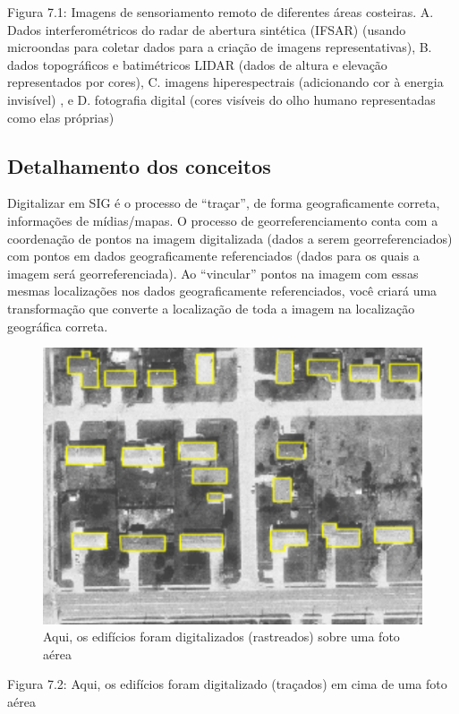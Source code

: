 \documentclass[
  portuguese,
]{krantz}
\begin{document}
Figura 7.1: Imagens de sensoriamento remoto de diferentes áreas costeiras. A. Dados interferométricos do radar de abertura sintética (IFSAR) (usando microondas para coletar dados para a criação de imagens representativas), B. dados topográficos e batimétricos LIDAR (dados de altura e elevação representados por cores), C. imagens hiperespectrais (adicionando cor à energia invisível) , e D. fotografia digital (cores visíveis do olho humano representadas como elas próprias)

\hypertarget{detalhamento-dos-conceitos-3}{%
\subsection{Detalhamento dos conceitos}\label{detalhamento-dos-conceitos-3}}

Digitalizar em SIG é o processo de ``traçar'', de forma geograficamente correta, informações de mídias/mapas. O processo de georreferenciamento conta com a coordenação de pontos na imagem digitalizada (dados a serem georreferenciados) com pontos em dados geograficamente referenciados (dados para os quais a imagem será georreferenciada). Ao ``vincular'' pontos na imagem com essas mesmas localizações nos dados geograficamente referenciados, você criará uma transformação que converte a localização de toda a imagem na localização geográfica correta.

\begin{figure}
\centering
\includegraphics{media/modulo7/buildings.png}
\caption{Aqui, os edifícios foram digitalizados (rastreados) sobre uma foto aérea}
\end{figure}

Figura 7.2: Aqui, os edifícios foram digitalizado (traçados) em cima de uma foto aérea
\end{document}
